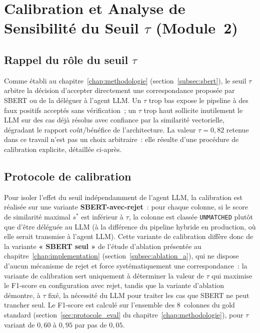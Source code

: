 \section{Calibration et Analyse de Sensibilité du Seuil $\tau$
         (Module~2)}
\label{sec:calibration_tau}

\subsection{Rappel du rôle du seuil $\tau$}

Comme établi au chapitre~\ref{chap:methodologie} (section~\ref{subsec:sbert}),
le seuil $\tau$ arbitre la décision d'accepter directement une
correspondance proposée par SBERT ou de la déléguer à l'agent LLM. Un
$\tau$ trop bas expose le pipeline à des faux positifs acceptés sans
vérification~; un $\tau$ trop haut sollicite inutilement le LLM sur des
cas déjà résolus avec confiance par la similarité vectorielle, dégradant
le rapport coût/bénéfice de l'architecture. La valeur $\tau = 0{,}82$
retenue dans ce travail n'est pas un choix arbitraire~: elle résulte
d'une procédure de calibration explicite, détaillée ci-après.

\subsection{Protocole de calibration}
\label{subsec:protocole_calibration_tau}

Pour isoler l'effet du seuil indépendamment de l'agent LLM, la
calibration est réalisée sur une variante \textbf{SBERT-avec-rejet}~:
pour chaque colonne, si le score de similarité maximal $s^*$ est
inférieur à $\tau$, la colonne est classée \texttt{UNMATCHED} plutôt que
d'être déléguée au LLM (à la différence du pipeline hybride en
production, où elle serait transmise à l'agent LLM). Cette variante de
calibration diffère donc de la variante \textbf{« SBERT seul »} de
l'étude d'ablation présentée au chapitre~\ref{chap:implementation}
(section~\ref{subsec:ablation_a}), qui ne dispose d'aucun mécanisme de
rejet et force systématiquement une correspondance~: la variante de
calibration sert uniquement à déterminer la valeur de $\tau$ qui
maximise le F1-score en configuration avec rejet, tandis que la variante
d'ablation démontre, à $\tau$ fixé, la nécessité du LLM pour traiter les
cas que SBERT ne peut trancher seul. Le F1-score est calculé sur
l'ensemble des 8~colonnes du gold standard (section~\ref{sec:protocole_eval}
du chapitre~\ref{chap:methodologie}), pour $\tau$ variant de $0{,}60$ à
$0{,}95$ par pas de $0{,}05$.

